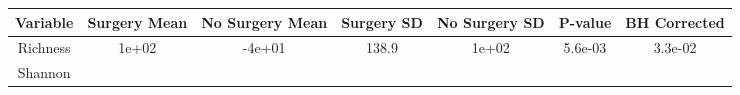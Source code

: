 \documentclass[12pt,]{article}
\begin{document}
\begin{longtable}[]{@{}ccccccc@{}}
\toprule
\begin{minipage}[b]{0.22\columnwidth}\centering\strut
Variable\strut
\end{minipage} & \begin{minipage}[b]{0.10\columnwidth}\centering\strut
Surgery Mean\strut
\end{minipage} & \begin{minipage}[b]{0.12\columnwidth}\centering\strut
No Surgery Mean\strut
\end{minipage} & \begin{minipage}[b]{0.09\columnwidth}\centering\strut
Surgery SD\strut
\end{minipage} & \begin{minipage}[b]{0.11\columnwidth}\centering\strut
No Surgery SD\strut
\end{minipage} & \begin{minipage}[b]{0.07\columnwidth}\centering\strut
P-value\strut
\end{minipage} & \begin{minipage}[b]{0.10\columnwidth}\centering\strut
BH Corrected\strut
\end{minipage}\tabularnewline
\midrule
\endhead
\begin{minipage}[t]{0.22\columnwidth}\centering\strut
Richness\strut
\end{minipage} & \begin{minipage}[t]{0.10\columnwidth}\centering\strut
1e+02\strut
\end{minipage} & \begin{minipage}[t]{0.12\columnwidth}\centering\strut
-4e+01\strut
\end{minipage} & \begin{minipage}[t]{0.09\columnwidth}\centering\strut
138.9\strut
\end{minipage} & \begin{minipage}[t]{0.11\columnwidth}\centering\strut
1e+02\strut
\end{minipage} & \begin{minipage}[t]{0.07\columnwidth}\centering\strut
5.6e-03\strut
\end{minipage} & \begin{minipage}[t]{0.10\columnwidth}\centering\strut
3.3e-02\strut
\end{minipage}\tabularnewline
\begin{minipage}[t]{0.22\columnwidth}\centering\strut
Shannon\strut
\end{minipage} & \begin{minipage}[t]{0.10\columnwidth}\centering\strut

\end{minipage}
\end{longtable}
\end{document}
